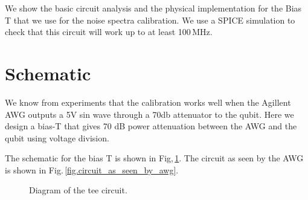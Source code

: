 %
%

%


We show the basic circuit analysis and the physical implementation for the Bias T that we use for the noise spectra calibration.  We use a SPICE simulation to check that this circuit will work up to at least 100\,MHz.

\section{Schematic}

We know from experiments that the calibration works well when the Agillent AWG outputs a 5V sin wave through a 70db attenuator to the qubit.
Here we design a bias-T that gives 70 dB power attenuation between the AWG and the qubit using voltage division.  

The schematic for the bias T is shown in Fig,\,\ref{fig.circuit_diagram}.
The circuit as seen by the AWG is shown in Fig.\,\ref{fig.circuit_as_seen_by_awg}.

\begin{figure}[ht]
\begin{centering}
\par\end{centering}
\caption{Diagram of the tee circuit.}
\label{fig.circuit_diagram}
\end{figure}


